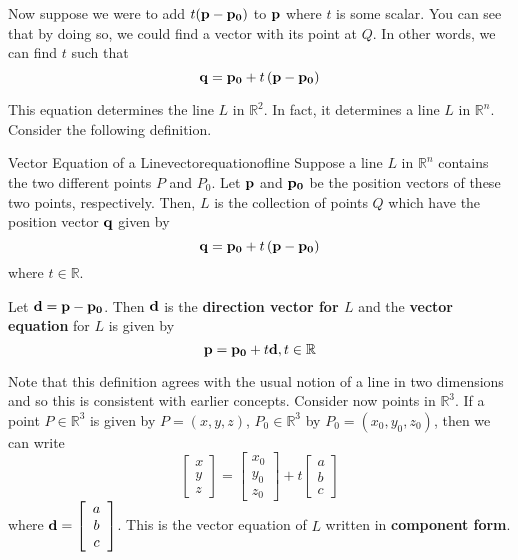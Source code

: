 Now suppose we were to add $t({\bf p} - {\bf p_0})$ to ${\bf p}$ where $t$ is some scalar.
You can see that by doing so, we could find a vector with its point at $Q$. In other words, we can find $t$ such that 
\begin{equation*}
{\bf q} = {\bf p_0} + t \left( {\bf p}- {\bf p_0}\right)
\end{equation*}

This equation determines the line $L$ in $\mathbb{R}^2$. In fact, it determines a line $L$ in $\mathbb{R}^n$. Consider the following definition.

\begin{definition}{Vector Equation of a Line}{vectorequationofline}
Suppose a line $L$ in $\mathbb{R}^{n}$ contains the two different points $P$ and 
$P_0$. Let ${\bf p}$ and ${\bf p_0}$ be the position vectors of these two points, respectively.
Then, $L$ is the collection of points $Q$ which have the position vector ${\bf q}$ given by
\begin{equation*}
{\bf q}={\bf p_0}+t\left( {\bf p}-{\bf p_0}\right)
\end{equation*}
where $t\in \mathbb{R}$. 

Let ${\bf d} = {\bf p} - {\bf p_0}$. Then ${\bf d}$ is the \textbf{direction vector for $L$} and the \textbf{vector equation} for $L$ is given by 
\begin{equation*}
{\bf p}={\bf p_0}+t{\bf d}, t\in\mathbb{R}
\end{equation*}
\end{definition}

Note that this definition agrees with the usual notion of a
line in two dimensions and so this is consistent with earlier concepts. Consider now points in $\mathbb{R}^3$. If a point $P \in \mathbb{R}^3$ is given by $P = \left( x,y,z \right)$, $P_0 \in \mathbb{R}^3$ by $P_0 = \left( x_0, y_0, z_0 \right)$, then we can write
\begin{equation*}
\left[
\begin{array}{c}
x \\
y \\
z 
\end{array}
\right] = 
\left[
\begin{array}{c}
x_0 \\
y_0 \\
z_0 
\end{array}
\right]
+
t
\left[
\begin{array}{c}
a \\
b \\
c 
\end{array}
\right]
\end{equation*}
where ${\bf d} = \left[
\begin{array}{c}
a \\
b \\
c 
\end{array}
\right]$. This is the vector equation of $L$ written in \textbf{component form}.

